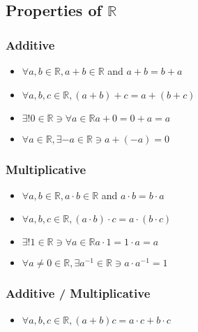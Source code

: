 \documentclass{article}
\theoremstyle{break}
\begin{document}
\subsection{Properties of $\mathbb{R}$}
\subsubsection{Additive}
\begin{itemize}
\item $\forall a, b \in \mathbb{R}, a + b \in \mathbb{R}$ and $a + b = b + a$
\item $\forall a, b, c \in \mathbb{R}, (a+b)+c = a+(b+c)$
\item $\exists! 0 \in \mathbb{R} \ni \forall a \in \mathbb{R} a + 0 = 0 + a = a$
\item $\forall a \in \mathbb{R}, \exists -a \in \mathbb{R} \ni a + (-a) = 0$
\end{itemize}

\subsubsection{Multiplicative}
\begin{itemize}
\item $\forall a, b \in \mathbb{R}, a \cdot b \in \mathbb{R}$ and $a \cdot b = b \cdot a$
\item $\forall a, b, c \in \mathbb{R}, (a \cdot b) \cdot c = a \cdot (b \cdot c)$
\item $\exists! 1 \in \mathbb{R} \ni \forall a \in \mathbb{R} a \cdot 1 = 1 \cdot a = a$
\item $\forall a \not= 0 \in \mathbb{R}, \exists a^{-1} \in \mathbb{R} \ni a \cdot a^{-1} = 1$
\end{itemize}

\subsubsection{Additive / Multiplicative}
\begin{itemize}
\item $\forall a, b, c \in \mathbb{R}, (a + b)c = a \cdot c + b \cdot c$
\end{itemize}
\end{document}
